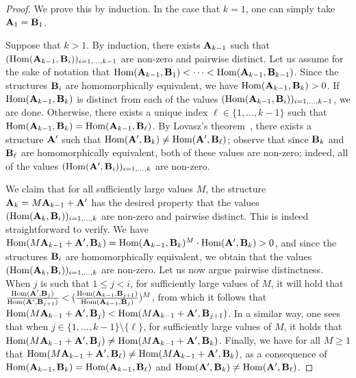 \documentclass[11pt]{article}
\begin{document}
\begin{proof}
We prove this by induction.  In the case that $k = 1$,
one can simply take $\mathbf{A}_1 = \mathbf{B}_1$.

Suppose that $k > 1$.
By induction, there exists $\mathbf{A}_{k-1}$
such that 
$(\mathrm{Hom}(\mathbf{A}_{k-1},\mathbf{B}_i))_{i=1,\ldots,k-1}$
are non-zero and pairwise distinct.
Let us assume for the sake of notation
that $\mathrm{Hom}(\mathbf{A}_{k-1},\mathbf{B}_1) < \cdots < \mathrm{Hom}(\mathbf{A}_{k-1},\mathbf{B}_{k-1})$.
Since the structures $\mathbf{B}_i$ are homomorphically equivalent,
we have $\mathrm{Hom}(\mathbf{A}_{k-1},\mathbf{B}_k) > 0$.
If $\mathrm{Hom}(\mathbf{A}_{k-1},\mathbf{B}_k)$ 
is distinct from
each of the values $(\mathrm{Hom}(\mathbf{A}_{k-1},\mathbf{B}_i))_{i=1,\ldots,k-1}$,
we are done.
Otherwise, there exists a
unique index $\ell \in \{ 1, \ldots, k-1 \}$ such that
$\mathrm{Hom}(\mathbf{A}_{k-1},\mathbf{B}_k) = \mathrm{Hom}(\mathbf{A}_{k-1},\mathbf{B}_\ell)$.
By Lovasz's theorem~\cite{Lovasz67-operations-structures}, there exists a structure $\mathbf{A}'$
such that 
$\mathrm{Hom}(\mathbf{A}',\mathbf{B}_k) \neq \mathrm{Hom}(\mathbf{A}',\mathbf{B}_\ell)$;
observe that 
since $\mathbf{B}_k$ and $\mathbf{B}_\ell$ are homomorphically equivalent,
both of these values are non-zero;
indeed, all of the values $(\mathrm{Hom}(\mathbf{A}',\mathbf{B}_i))_{i = 1,\ldots,k}$ 
are non-zero.



We claim that for all sufficiently large values $M$,
the structure $\mathbf{A}_k = M \mathbf{A}_{k-1} + \mathbf{A}'$
has the desired property that
the values $(\mathrm{Hom}(\mathbf{A}_k,\mathbf{B}_i))_{i=1,\ldots,k}$
are non-zero and pairwise distinct.
This is indeed straightforward to verify.
We have $\mathrm{Hom}(M \mathbf{A}_{k-1} + \mathbf{A}',\mathbf{B}_k)
= \mathrm{Hom}(\mathbf{A}_{k-1},\mathbf{B}_k)^M \cdot \mathrm{Hom}(\mathbf{A}',\mathbf{B}_k) > 0$,
and since the structures $\mathbf{B}_i$ are homomorphically equivalent,
we obtain that
the values $(\mathrm{Hom}(\mathbf{A}_k,\mathbf{B}_i))_{i=1,\ldots,k}$
are non-zero.
Let us now argue pairwise distinctness.
When $j$ is such that $1 \leq j < i$,
for sufficiently large values of $M$,
it will hold that
$\frac{\mathrm{Hom}(\mathbf{A}',\mathbf{B}_j)}{\mathrm{Hom}(\mathbf{A}',\mathbf{B}_{j+1})} <
(\frac{\mathrm{Hom}(\mathbf{A}_{k-1},\mathbf{B}_{j+1})}{\mathrm{Hom}(\mathbf{A}_{k-1},\mathbf{B}_j)})^M$,
from which it follows that
$ \mathrm{Hom}(M \mathbf{A}_{k-1} + \mathbf{A}',\mathbf{B}_j) 
< \mathrm{Hom}(M \mathbf{A}_{k-1} + \mathbf{A}',\mathbf{B}_{j+1}) $.
In a similar way, one sees 
that when $j \in \{ 1, \ldots, k-1 \} \setminus \{ \ell \}$,
for sufficiently large values of $M$,
it holds that
$\mathrm{Hom}(M \mathbf{A}_{k-1} + \mathbf{A}',\mathbf{B}_j) \neq
\mathrm{Hom}(M \mathbf{A}_{k-1} + \mathbf{A}',\mathbf{B}_k)$.
Finally, we have for all $M \geq 1$ that
$\mathrm{Hom}(M \mathbf{A}_{k-1} + \mathbf{A}',\mathbf{B}_\ell) \neq
\mathrm{Hom}(M \mathbf{A}_{k-1} + \mathbf{A}',\mathbf{B}_k)$,
as a consequence of 
$\mathrm{Hom}(\mathbf{A}_{k-1},\mathbf{B}_k) = \mathrm{Hom}(\mathbf{A}_{k-1},\mathbf{B}_\ell)$ and
$\mathrm{Hom}(\mathbf{A}',\mathbf{B}_k) \neq \mathrm{Hom}(\mathbf{A}',\mathbf{B}_\ell)$.
\end{proof}
\end{document}

